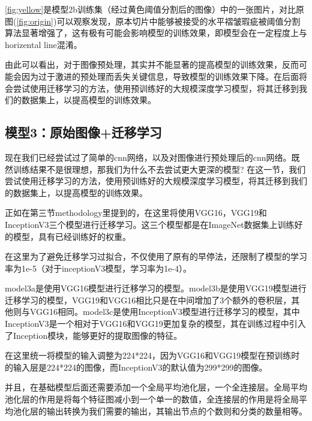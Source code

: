 \autoref{fig:yellow}是模型2b训练集（经过黄色阈值分割后的图像）中的一张图片，对比原图(\autoref{fig:origin})可以观察发现，原本切片中能够被接受的水平褶皱瑕疵被阈值分割算法显著增强了，这有极有可能会影响模型的训练效果，即模型会在一定程度上与horizental line混淆。

由此可以看出，对于图像预处理，其实并不能显著的提高模型的训练效果，反而可能会因为过于激进的预处理而丢失关键信息，导致模型的训练效果下降。在后面将会尝试使用迁移学习的方法，使用预训练好的大规模深度学习模型，将其迁移到我们的数据集上，以提高模型的训练效果。

\FloatBarrier

\subsection{模型3：原始图像+迁移学习}

现在我们已经尝试过了简单的cnn网络，以及对图像进行预处理后的cnn网络。既然训练结果不是很理想，那我们为什么不去尝试更大更深的模型? 在这一节，我们尝试使用迁移学习的方法，使用预训练好的大规模深度学习模型，将其迁移到我们的数据集上，以提高模型的训练效果。

正如在第三节methodology里提到的，在这里将使用VGG16，VGG19和InceptionV3三个模型进行迁移学习。这三个模型都是在ImageNet数据集上训练好的模型，具有已经训练好的权重。

在这里为了避免迁移学习过拟合，不仅使用了原有的早停法，还限制了模型的学习率为1e-5（对于inceptionV3模型，学习率为1e-4）。

model3a是使用VGG16模型进行迁移学习的模型。model3b是使用VGG19模型进行迁移学习的模型，VGG19和VGG16相比只是在中间增加了3个额外的卷积层，其他则与VGG16相同。model3c是使用InceptionV3模型进行迁移学习的模型，其中InceptionV3是一个相对于VGG16和VGG19更加复杂的模型，其在训练过程中引入了Inception模块，能够更好的提取图像的特征。

在这里统一将模型的输入调整为224*224，因为VGG16和VGG19模型在预训练时的输入层是224*224的图像，而InceptionV3的默认值为299*299的图像。

并且，在基础模型后面还需要添加一个全局平均池化层，一个全连接层。全局平均池化层的作用是将每个特征图减小到一个单一的数值，全连接层的作用是将全局平均池化层的输出转换为我们需要的输出，其输出节点的个数则和分类的数量相等。

